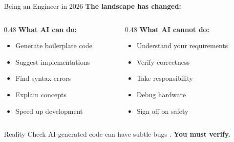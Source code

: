 \documentclass[aspectratio=169,11pt]{beamer}
\begin{document}
\begin{frame}{Being an Engineer in 2026}
    \textbf{The landscape has changed:}
    
    \vspace{0.3cm}
    \begin{columns}[T]
        \begin{column}{0.48\textwidth}
            \textbf{What AI can do:}
            \begin{itemize}
                \item Generate boilerplate code
                \item Suggest implementations
                \item Find syntax errors
                \item Explain concepts
                \item Speed up development \cite{kalliamvakou2024measuring}
            \end{itemize}
        \end{column}
        \begin{column}{0.48\textwidth}
            \textbf{What AI cannot do:}
            \begin{itemize}
                \item Understand your requirements
                \item Verify correctness
                \item Take responsibility
                \item Debug hardware
                \item Sign off on safety
            \end{itemize}
        \end{column}
    \end{columns}
    
    \vspace{0.3cm}
    \begin{block}{Reality Check}
        AI-generated code can have subtle bugs \cite{siddiq2024quality}. \textbf{You must verify.}
    \end{block}
\end{frame}
\end{document}
